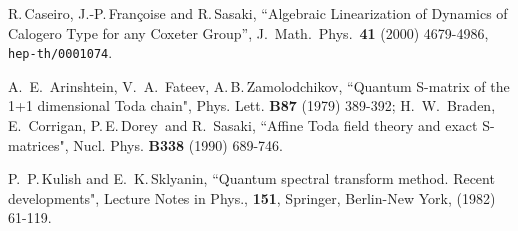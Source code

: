 \documentclass[a4paper,12pt]{article}
\begin{document}
\begin{thebibliography}{99}
R.\,Caseiro, J.-P.\,Fran\c{c}oise and R.\,Sasaki,
``Algebraic Linearization of Dynamics of Calogero Type for any
Coxeter Group'',
J.\ Math.\ Phys.\ {\bf 41} (2000) 4679-4986,
{\tt hep-th/0001074}.



A.\, E.\, Arinshtein, V.\, A.\, Fateev, A.\,B.\,Zamolodchikov,
``Quantum S-matrix of the 1+1 dimensional Toda chain",
Phys. Lett. {\bf B87} (1979) 389-392;
H.\, W.\, Braden, E.\, Corrigan, P.\,E.\,Dorey\ and R.\, Sasaki,
``Affine Toda field theory and exact S-matrices",
Nucl. Phys. {\bf B338} (1990) 689-746.




P.\, P.\,Kulish and E.\, K.\,Sklyanin,  ``Quantum spectral transform method.
Recent developments",  Lecture Notes in Phys., {\bf 151}, Springer,
Berlin-New York, (1982)  61-119.


\end{thebibliography}
\end{document}
